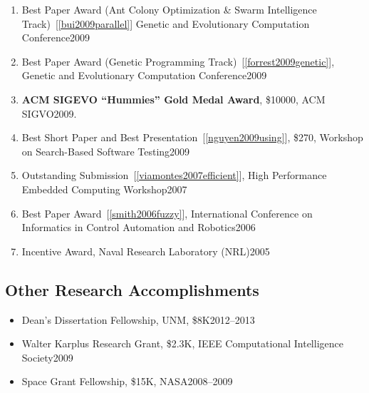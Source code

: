 \documentclass[10pt]{article}
\begin{document}
\begin{enumerate}
\item Best Paper Award (Ant Colony Optimization \& Swarm Intelligence Track)~[\ref{bui2009parallel}] Genetic and Evolutionary Computation Conference\hfill 2009
\item Best Paper Award (Genetic Programming Track)~[\ref{forrest2009genetic}], Genetic and Evolutionary Computation Conference\hfill 2009
\item \textbf{ACM SIGEVO “Hummies” Gold Medal Award}, \$10000, ACM SIGVO\hfill 2009.
\item Best Short Paper and Best Presentation~[\ref{nguyen2009using}], \$270, Workshop on Search-Based Software Testing\hfill 2009
\item Outstanding Submission~[\ref{viamontes2007efficient}], High Performance Embedded Computing Workshop\hfill 2007
\item  Best Paper Award~[\ref{smith2006fuzzy}],  International Conference on Informatics in Control Automation and Robotics\hfill 2006
\item Incentive Award,  Naval Research Laboratory (NRL)\hfill 2005
\end{enumerate}

\subsection{Other Research Accomplishments}
\begin{itemize}
\item Dean's Dissertation Fellowship, UNM, \$8K\hfill 2012--2013
\item Walter Karplus Research Grant, \$2.3K, IEEE Computational Intelligence Society\hfill 2009 
\item Space Grant Fellowship, \$15K, NASA\hfill 2008--2009 
\end{itemize}
\end{document}
